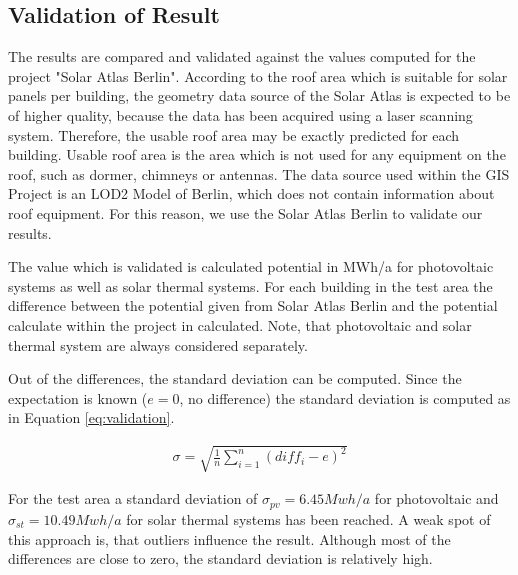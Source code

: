 \subsection{Validation of Result}
The results are compared and validated against the values computed for the project "Solar Atlas Berlin". According to the roof area which is suitable for solar panels per building, the geometry data source of the Solar Atlas is expected to be of higher quality, because the data has been acquired using a laser scanning system. Therefore, the usable roof area may be exactly predicted for each building. Usable roof area is the area which is not used for any equipment on the roof, such as dormer, chimneys or antennas. The data source used within the GIS Project is an LOD2 Model of Berlin, which does not contain information about roof equipment. For this reason, we use the Solar Atlas Berlin to validate our results.

The value which is validated is calculated potential in MWh/a for photovoltaic systems as well as solar thermal systems. For each building in the test area the difference between the potential given from Solar Atlas Berlin and the potential calculate within the project in calculated. Note, that photovoltaic and solar thermal system are always considered separately.

Out of the differences, the standard deviation can be computed. Since the expectation is known ($e=0$, no difference) the standard deviation is computed as in Equation \ref{eq:validation}.

\begin{align}
\label{eq:validation}
\sigma = \sqrt{\frac{1}{n} \sum\limits_{i=1}^n (diff_i - e )^2}
\end{align}

For the test area a standard deviation of $\sigma_{pv} = 6.45 Mwh/a$ for photovoltaic and $\sigma_{st} = 10.49 Mwh/a$ for solar thermal systems has been reached. A weak spot of this approach is, that outliers influence the result. Although most of the differences are close to zero, the standard deviation is relatively high.
